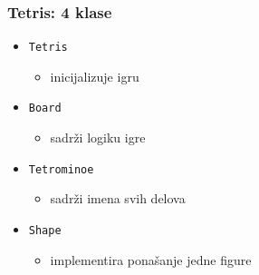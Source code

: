 \documentclass[utf8,compress]{beamer}
\begin{document}
\begin{frame}[fragile]
  \frametitle{Tetris: 4 klase}
  \begin{itemize}
    \item \texttt{Tetris}
    \begin{itemize}
      \item inicijalizuje igru
    \end{itemize}
    \item \texttt{Board}
    \begin{itemize}
      \item sadrži logiku igre
    \end{itemize}
    \item \texttt{Tetrominoe}
    \begin{itemize}
      \item sadrži imena svih delova
    \end{itemize}
    \item \texttt{Shape}
    \begin{itemize}
      \item implementira ponašanje jedne figure
    \end{itemize}
  \end{itemize}
\end{frame}
\end{document}
